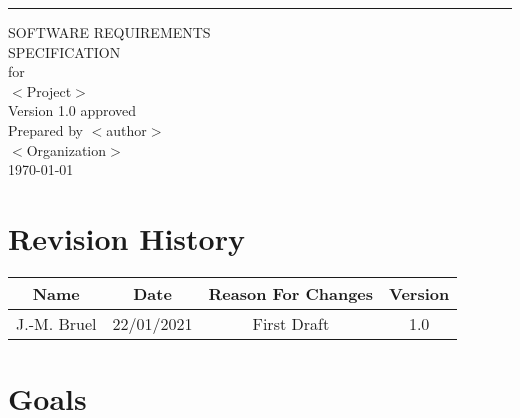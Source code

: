 \documentclass{scrreprt}
\date{}
\def\myversion{1.0 }
\begin{document}
\begin{flushright}
    \rule{16cm}{5pt}\vskip1cm
    \begin{bfseries}
        \Huge{SOFTWARE REQUIREMENTS\\ SPECIFICATION}\\
        \vspace{1.9cm}
        for\\
        \vspace{1.9cm}
        $<$Project$>$\\
        \vspace{1.9cm}
        \LARGE{Version \myversion approved}\\
        \vspace{1.9cm}
        Prepared by $<$author$>$\\
        \vspace{1.9cm}
        $<$Organization$>$\\
        \vspace{1.9cm}
        \today\\
    \end{bfseries}
\end{flushright}

\chapter{Revision History}

\begin{center}
    \begin{tabular}{|c|c|c|c|}
        \hline
	    Name        & Date          & Reason For Changes & Version\\
        \hline
        \hline
	    J.-M. Bruel & 22/01/2021    & First Draft & 1.0\\
        \hline
    \end{tabular}
\end{center}

\dominitoc%
\tableofcontents

\chapter{Goals}
\minitoc%
\end{document}
